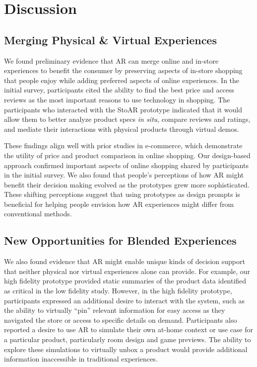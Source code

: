 \section{Discussion}

\subsection{Merging Physical \& Virtual Experiences}
We found preliminary evidence that AR can merge online and in-store experiences to benefit the consumer by preserving aspects of in-store shopping that people enjoy while adding preferred aspects of online experiences. In the initial survey, participants cited the ability to find the best price and access reviews as the most important reasons to use technology in shopping. The participants who interacted with the StoAR prototype indicated that it would allow them to better analyze product specs \emph{in situ}, compare reviews and ratings, and mediate their interactions with physical products through virtual demos.

These findings align well with prior studies in e-commerce, which demonstrate the utility of price and product comparison in online shopping. Our design-based approach confirmed important aspects of online shopping shared by participants in the initial survey. We also found that people's perceptions of how AR might benefit their decision making evolved as the prototypes grew more sophisticated. These shifting perceptions suggest that using prototypes as design prompts is beneficial for helping people envision how AR experiences might differ from conventional methods. 

\subsection{New Opportunities for Blended Experiences}
We also found evidence that AR might enable unique kinds of decision support that neither physical nor virtual experiences alone can provide. For example, our high fidelity prototype provided static summaries of the product data identified as critical in the low fidelity study. However, in the high fidelity prototype, participants expressed an additional desire to interact with the system, such as the ability to virtually ``pin'' relevant information for easy access as they navigated the store or access to specific details on demand. Participants also reported a desire to use AR to simulate their own at-home context or use case for a particular product, particularly room design and game previews. 
The ability to explore these simulations to virtually unbox a product would provide additional information inaccessible in traditional experiences.

